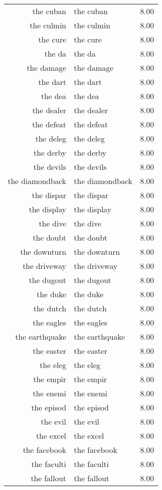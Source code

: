 \begin{table}[ht]
\begin{tabular}{rlr}
  the cuban & the cuban & 8.00 \\ 
  the culmin & the culmin & 8.00 \\ 
  the cure & the cure & 8.00 \\ 
  the da & the da & 8.00 \\ 
  the damage & the damage & 8.00 \\ 
  the dart & the dart & 8.00 \\ 
  the dea & the dea & 8.00 \\ 
  the dealer & the dealer & 8.00 \\ 
  the defeat & the defeat & 8.00 \\ 
  the deleg & the deleg & 8.00 \\ 
  the derby & the derby & 8.00 \\ 
  the devils & the devils & 8.00 \\ 
  the diamondback & the diamondback & 8.00 \\ 
  the dispar & the dispar & 8.00 \\ 
  the display & the display & 8.00 \\ 
  the dive & the dive & 8.00 \\ 
  the doubt & the doubt & 8.00 \\ 
  the downturn & the downturn & 8.00 \\ 
  the driveway & the driveway & 8.00 \\ 
  the dugout & the dugout & 8.00 \\ 
  the duke & the duke & 8.00 \\ 
  the dutch & the dutch & 8.00 \\ 
  the eagles & the eagles & 8.00 \\ 
  the earthquake & the earthquake & 8.00 \\ 
  the easter & the easter & 8.00 \\ 
  the eleg & the eleg & 8.00 \\ 
  the empir & the empir & 8.00 \\ 
  the enemi & the enemi & 8.00 \\ 
  the episod & the episod & 8.00 \\ 
  the evil & the evil & 8.00 \\ 
  the excel & the excel & 8.00 \\ 
  the facebook & the facebook & 8.00 \\ 
  the faculti & the faculti & 8.00 \\ 
  the fallout & the fallout & 8.00 \\ 

\end{tabular}
\end{table}

